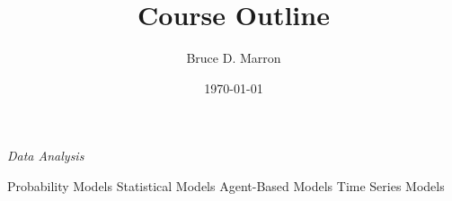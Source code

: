 \documentclass[12pt, letterpaper]{article}
\title{\vspace{-15mm}\fontsize{14pt}{10pt}
                    \selectfont \textbf{Course Outline}   %
                    \vspace{-7mm}
      }
\author{
     \normalsize Bruce D. Marron \\                     %
     \vspace{-5mm}
}
\date{\normalsize \today}
\begin{document}
\begin{singlespacing}
\end{singlespacing}
\thispagestyle{fancy}                           %


\large
\begin{flushleft}
\textit{Data Analysis}
\end{flushleft}

\normalsize
\begin{outline}[enumerate]
\1 Probability Models
\1 Statistical Models
\1 Agent-Based Models
\1 Time Series Models

\end{outline}




\clearpage 
\renewcommand{\thepage}{}
\printbibliography
\end{document}
